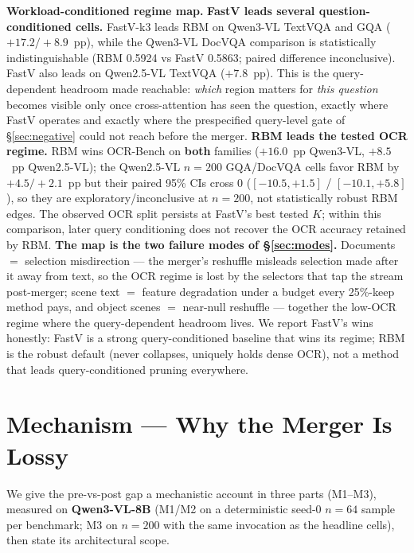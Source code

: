 \documentclass[sigconf,nonacm]{acmart}
\begin{document}
\textbf{Workload-conditioned regime map.}
\textbf{FastV leads several question-conditioned cells.} FastV-k3 leads RBM on
Qwen3-VL TextVQA and GQA ($+17.2 / +8.9$~pp), while the Qwen3-VL DocVQA
comparison is statistically indistinguishable (RBM 0.5924 vs FastV 0.5863;
paired difference inconclusive). FastV also leads on Qwen2.5-VL TextVQA
($+7.8$~pp). This is the query-dependent
headroom made reachable: \emph{which} region matters for \emph{this question}
becomes visible only once cross-attention has seen the question, exactly where
FastV operates and exactly where the prespecified query-level gate of
\S\ref{sec:negative} could not reach before the merger. \textbf{RBM leads the
tested OCR regime.} RBM wins OCR-Bench on \textbf{both} families ($+16.0$~pp
Qwen3-VL, $+8.5$~pp Qwen2.5-VL); the Qwen2.5-VL $n = 200$ GQA/DocVQA cells
favor RBM by $+4.5 / +2.1$~pp but their paired 95\% CIs cross 0
($[-10.5, +1.5]$ / $[-10.1, +5.8]$), so they are exploratory/inconclusive at
$n = 200$, not statistically robust RBM edges. The observed OCR split persists
at FastV's best tested $K$; within this comparison, later query conditioning
does not recover the OCR accuracy retained by RBM. \textbf{The map is the two
failure modes of \S\ref{sec:modes}.} Documents $=$ selection misdirection ---
the merger's reshuffle misleads selection made after it away from text, so the
OCR regime is lost by the selectors that tap the stream post-merger; scene text
$=$ feature degradation under a budget every 25\%-keep method pays, and object
scenes $=$ near-null reshuffle --- together the low-OCR regime where the
query-dependent headroom lives. We report FastV's wins honestly: FastV is a
strong query-conditioned baseline that wins its regime; RBM is the robust
default (never collapses, uniquely holds dense OCR), not a method that leads
query-conditioned pruning everywhere.

\section{Mechanism --- Why the Merger Is Lossy}\label{sec:mechanism}

We give the pre-vs-post gap a mechanistic account in three parts (M1--M3),
measured on \textbf{Qwen3-VL-8B} (M1/M2 on a deterministic seed-0 $n = 64$ sample
per benchmark; M3 on $n = 200$ with the same invocation as the headline cells),
then state its architectural scope.
\end{document}
